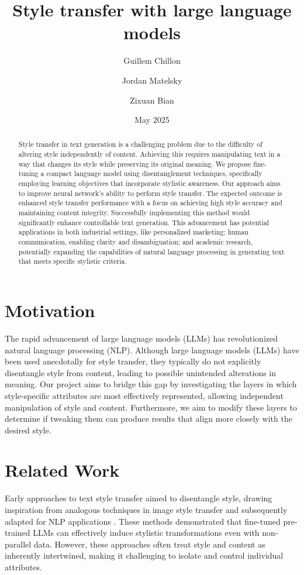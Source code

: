 \documentclass[twocolumn]{article}
\title{Style transfer with large language models}
\author[1]{Guillem Chillon}
\author[2]{Jordan Matelsky}
\author[3]{Zixuan Bian}
\affil[1]{guillemc@seas.upenn.edu}
\affil[2]{matelsky@upenn.edu}
\affil[3]{bianzx@seas.upenn.edu}
\date{May 2025}
\begin{document}
\maketitle

\begin{abstract}
Style transfer in text generation is a challenging problem due to the difficulty of altering style independently of content.
Achieving this requires manipulating text in a way that changes its style while preserving its original meaning.
We propose fine-tuning a compact language model using disentanglement techniques, specifically employing learning objectives that incorporate stylistic awareness.
Our approach aims to improve neural network's ability to perform style transfer. The expected outcome is enhanced style transfer performance with a focus on achieving high style accuracy and maintaining content integrity.
Successfully implementing this method would significantly enhance controllable text generation.
This advancement has potential applications in both industrial settings, like personalized marketing; human communication, enabling clarity and disambiguation; and academic research, potentially expanding the capabilities of natural language processing in generating text that meets specific stylistic criteria.

\end{abstract}

\section{Motivation}

The rapid advancement of large language models (LLMs) has revolutionized natural language processing (NLP). Although large language models (LLMs) have been used anecdotally for style transfer, they typically do not explicitly disentangle style from content, leading to possible unintended alterations in meaning. Our project aims to bridge this gap by investigating the layers in which style-specific attributes are most effectively represented, allowing independent manipulation of style and content. Furthermore, we aim to modify these layers to determine if tweaking them can produce results that align more closely with the desired style.

\section{Related Work}
Early approaches to text style transfer aimed to disentangle style, drawing inspiration from analogous techniques in image style transfer \citep{gatys2016image, zhu2017unpaired} and subsequently adapted for NLP applications \citep{john2019disentangled, patel2022low}. These methods demonstrated that fine-tuned pre-trained LLMs can effectively induce stylistic transformations even with non-parallel data. However, these approaches often treat style and content as inherently intertwined, making it challenging to isolate and control individual attributes.
\end{document}
